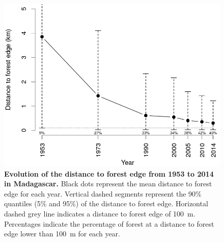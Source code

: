 \documentclass[a4paper, 12pt, leqno]{article} %
\begin{document}
\begin{figure}[h!]
  \centering
  
  \includegraphics[width=13cm]{dist.png}
  
  \caption{\textbf{Evolution of the distance to forest edge from
      1953 to 2014 in Madagascar.} Black dots represent the mean distance to
    forest edge for each year. Vertical dashed segments represent the 90\%
    quantiles (5\% and 95\%) of the distance to forest edge. Horizontal
    dashed grey line indicates a distance to forest edge of 100~m.
    Percentages indicate the percentage of forest at a distance to forest
    edge lower than 100~m for each year.}

  \label{fig:dist_edge}

\end{figure}
\end{document}
